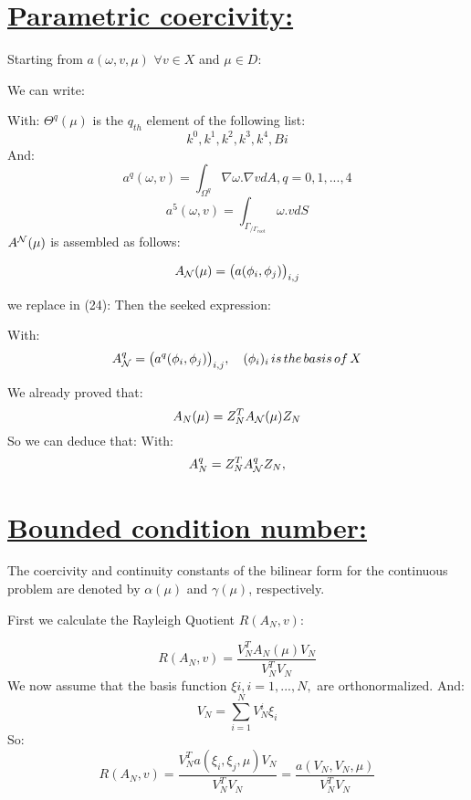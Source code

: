 \section[Question d: Parametric coercivity]{\uline{Parametric coercivity:}}

Starting from $a(\omega,v,\mu)$ $\forall v \in X$ and $\mu \in D$:

We can write:


With:
$\Theta^q(\mu)$ is the $q_{th}$ element of the following list:
 $${k^0,k^1,k^2,k^3,k^4,Bi}$$
And:
$$a^q(\omega,v) = \int_{\Omega^q} \nabla \omega . \nabla v dA , q= 0,1,...,4$$
$$a^5(\omega,v) = \int_{\Gamma_{/\Gamma_{root}}} \omega . v dS$$
$A^{\cal N}(\mu)$ is assembled as follows:

$$A_{\cal N}(\mu) = \big(a(\phi_i,\phi_j)\big)_{i,j}$$

we replace in (24):
Then the seeked expression:

With:
$$A_{\cal N}^q = \big(a^q(\phi_i,\phi_j) \big)_{i,j}, \quad (\phi_i)_i \, is \, the \, basis \, of \, X $$

We already proved that:
$$A_{ N}(\mu) = Z_{N}^T A_{\cal N}(\mu) Z_{N}$$
So we can deduce that:
With:
$$A_{N}^q = Z_N^T A_{\cal N}^q Z_N,$$


\section[Question e: Bounded condition number]{\uline{Bounded condition number:}}
The coercivity and continuity constants of the bilinear form for the continuous problem are denoted by $\alpha(\mu)$ and $\gamma(\mu)$, respectively.

First we calculate the Rayleigh Quotient $R(A_N,v)$:

$$R(A_N,v) = \frac {V_N^T A_N(\mu) V_N} {V_N^T V_N} $$
We now assume that the basis function $ξi, i = 1, . . . , N,$ are orthonormalized. And:
$$V_N  = \sum_{i=1}^N V^i_N \xi_i$$
So:
$$R(A_N,v) = \frac {V_N^T a(\xi_i,\xi_j,\mu) V_N} {V_N^T V_N} = \frac {a(V_N,V_N,\mu)} {V_N^T V_N} $$

